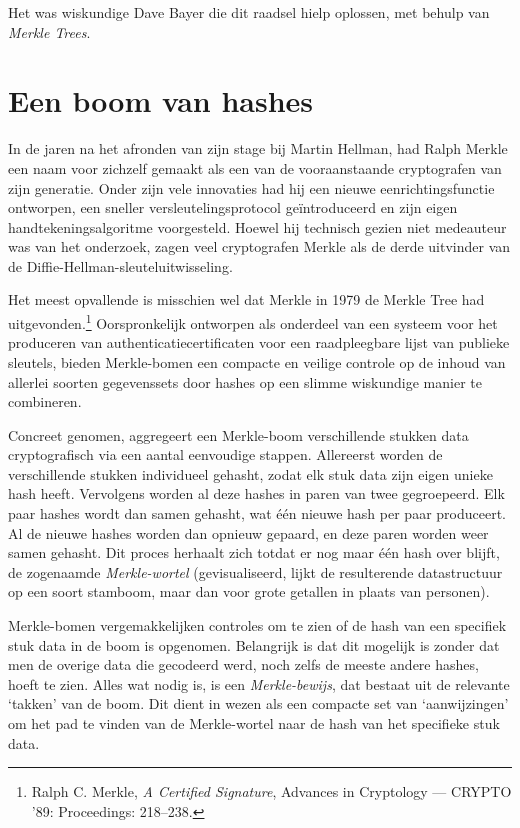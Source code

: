 \documentclass[
  a5paper,
  smalldemyvopaper,11pt,twoside,onecolumn,openright,extrafontsizes,
hidelinks]{memoir}
\begin{document}
Het was wiskundige Dave Bayer die dit raadsel hielp oplossen, met behulp
van \emph{Merkle Trees}.

\section{Een boom van hashes}\label{een-boom-van-hashes}

In de jaren na het afronden van zijn stage bij Martin Hellman, had Ralph
Merkle een naam voor zichzelf gemaakt als een van de vooraanstaande
cryptografen van zijn generatie. Onder zijn vele innovaties had hij een
nieuwe eenrichtingsfunctie ontworpen, een sneller versleutelingsprotocol
geïntroduceerd en zijn eigen handtekeningsalgoritme voorgesteld. Hoewel
hij technisch gezien niet medeauteur was van het onderzoek, zagen veel
cryptografen Merkle als de derde uitvinder van de
Diffie-Hellman-sleuteluitwisseling.

Het meest opvallende is misschien wel dat Merkle in 1979 de Merkle Tree
had uitgevonden.\footnote{Ralph C. Merkle, \emph{A Certified Signature},
  Advances in Cryptology --- CRYPTO '89: Proceedings: 218--238.}
Oorspronkelijk ontworpen als onderdeel van een systeem voor het
produceren van authenticatiecertificaten voor een raadpleegbare lijst
van publieke sleutels, bieden Merkle-bomen een compacte en veilige
controle op de inhoud van allerlei soorten gegevenssets door hashes op
een slimme wiskundige manier te combineren.

Concreet genomen, aggregeert een Merkle-boom verschillende stukken data
cryptografisch via een aantal eenvoudige stappen. Allereerst worden de
verschillende stukken individueel gehasht, zodat elk stuk data zijn
eigen unieke hash heeft. Vervolgens worden al deze hashes in paren van
twee gegroepeerd. Elk paar hashes wordt dan samen gehasht, wat één
nieuwe hash per paar produceert. Al de nieuwe hashes worden dan opnieuw
gepaard, en deze paren worden weer samen gehasht. Dit proces herhaalt
zich totdat er nog maar één hash over blijft, de zogenaamde
\emph{Merkle-wortel} (gevisualiseerd, lijkt de resulterende
datastructuur op een soort stamboom, maar dan voor grote getallen in
plaats van personen).

Merkle-bomen vergemakkelijken controles om te zien of de hash van een
specifiek stuk data in de boom is opgenomen. Belangrijk is dat dit
mogelijk is zonder dat men de overige data die gecodeerd werd, noch
zelfs de meeste andere hashes, hoeft te zien. Alles wat nodig is, is een
\emph{Merkle-bewijs}, dat bestaat uit de relevante `takken' van de boom.
Dit dient in wezen als een compacte set van `aanwijzingen' om het pad te
vinden van de Merkle-wortel naar de hash van het specifieke stuk data.
\end{document}
